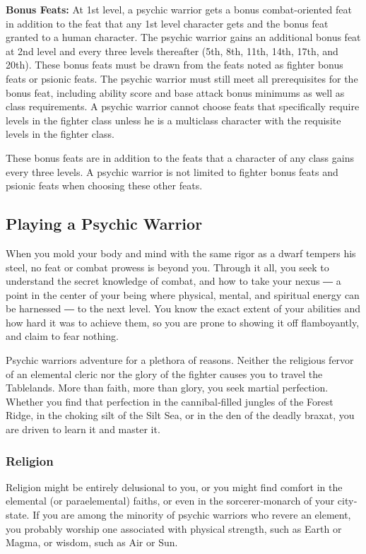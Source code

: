 \textbf{Bonus Feats:} At 1st level, a psychic warrior gets a bonus combat-oriented feat in addition to the feat that any 1st level character gets and the bonus feat granted to a human character. The psychic warrior gains an additional bonus feat at 2nd level and every three levels thereafter (5th, 8th, 11th, 14th, 17th, and 20th). These bonus feats must be drawn from the feats noted as fighter bonus feats or psionic feats. The psychic warrior must still meet all prerequisites for the bonus feat, including ability score and base attack bonus minimums as well as class requirements. A psychic warrior cannot choose feats that specifically require levels in the fighter class unless he is a multiclass character with the requisite levels in the fighter class.

These bonus feats are in addition to the feats that a character of any class gains every three levels. A psychic warrior is not limited to fighter bonus feats and psionic feats when choosing these other feats.

\subsection{Playing a Psychic Warrior}

When you mold your body and mind with the same rigor as a dwarf tempers his steel, no feat or combat prowess is beyond you. Through it all, you seek to understand the secret knowledge of combat, and how to take your nexus ― a point in the center of your being where physical, mental, and spiritual energy can be harnessed ― to the next level. You know the exact extent of your abilities and how hard it was to achieve them, so you are prone to showing it off flamboyantly, and claim to fear nothing.

Psychic warriors adventure for a plethora of reasons. Neither the religious fervor of an elemental cleric nor the glory of the fighter causes you to travel the Tablelands. More than faith, more than glory, you seek martial perfection. Whether you find that perfection in the cannibal‐filled jungles of the Forest Ridge, in the choking silt of the Silt Sea, or in the den of the deadly braxat, you are driven to learn it and master it.

\subsubsection{Religion}

Religion might be entirely delusional to you, or you might find comfort in the elemental (or paraelemental) faiths, or even in the sorcerer‐monarch of your city‐state. If you are among the minority of psychic warriors who revere an element, you probably worship one associated with physical strength, such as Earth or Magma, or wisdom, such as Air or Sun.

